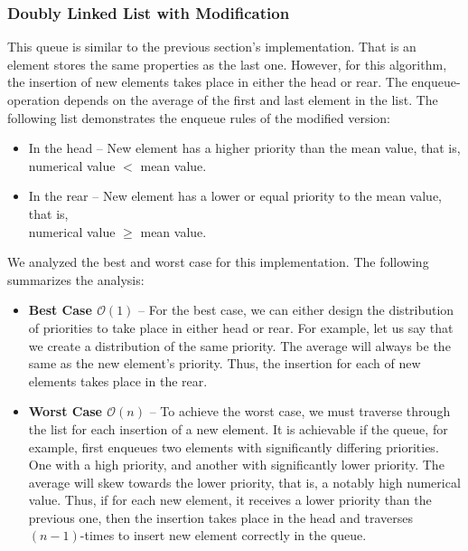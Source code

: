 \documentclass[a4paper,11pt]{kth-mag}
\newcommand*{\skippara}{\par\vspace{\baselineskip} \noindent}
\begin{document}
\subsubsection{Doubly Linked List with Modification}
This queue is similar to the previous section's implementation.
That is an element stores the same properties as the last one.
However, for this algorithm, the insertion of new elements takes place in either the head or rear.
The enqueue-operation depends on the average of the first and last element in the list.
The following list demonstrates the enqueue rules of the modified version:
\begin{itemize}
    \item In the head -- New element has a higher priority than the mean value, that is, \\numerical value $<$ mean value.
    \item In the rear -- New element has a lower or equal priority to the mean value, that is,\\numerical value $\ge$ mean value.
\end{itemize}

\skippara We analyzed the best and worst case for this implementation.
The following summarizes the analysis:
\begin{itemize}
    \item \textbf{Best Case $\mathcal{O}(1)$} --
       For the best case, we can either design the distribution of priorities to take place in either head or rear.
       For example, let us say that we create a distribution of the same priority.
       The average will always be the same as the new element's priority.
       Thus, the insertion for each of new elements takes place in the rear.
    \item \textbf{Worst Case $\mathcal{O}(n)$} --
        To achieve the worst case, we must traverse through the list for each insertion of a new element.
        It is achievable if the queue, for example, first enqueues two elements with significantly differing priorities.
        One with a high priority, and another with significantly lower priority.
        The average will skew towards the lower priority, that is, a notably high numerical value.
        Thus, if for each new element, it receives a lower priority than the previous one, then the insertion takes place in the head and traverses $(n - 1)$-times to insert new element correctly in the queue.
\end{itemize}
\end{document}
